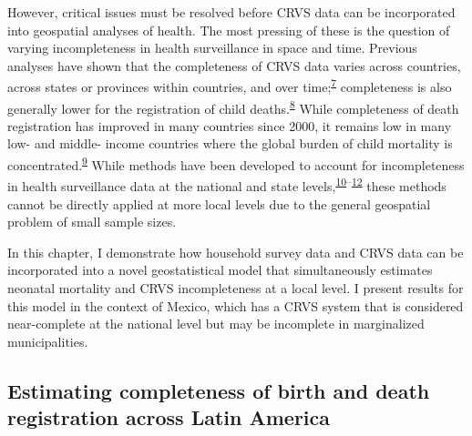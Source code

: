 \documentclass[
]{article}
\begin{document}
However, critical issues must be resolved before CRVS data can be incorporated into geospatial analyses of health. The most pressing of these is the question of varying incompleteness in health surveillance in space and time. Previous analyses have shown that the completeness of CRVS data varies across countries, across states or provinces within countries, and over time;\textsuperscript{\protect\hyperlink{ref-Adair2018}{7}} completeness is also generally lower for the registration of child deaths.\textsuperscript{\protect\hyperlink{ref-Malqvist2008}{8}} While completeness of death registration has improved in many countries since 2000, it remains low in many low- and middle- income countries where the global burden of child mortality is concentrated.\textsuperscript{\protect\hyperlink{ref-Mikkelsen2015}{9}} While methods have been developed to account for incompleteness in health surveillance data at the national and state levels,\textsuperscript{\protect\hyperlink{ref-Murray2010}{10}--\protect\hyperlink{ref-Bhat2002}{12}} these methods cannot be directly applied at more local levels due to the general geospatial problem of small sample sizes.

In this chapter, I demonstrate how household survey data and CRVS data can be incorporated into a novel geostatistical model that simultaneously estimates neonatal mortality and CRVS incompleteness at a local level. I present results for this model in the context of Mexico, which has a CRVS system that is considered near-complete at the national level but may be incomplete in marginalized municipalities.

\hypertarget{estimating-completeness-of-birth-and-death-registration-across-latin-america}{%
\subsection{Estimating completeness of birth and death registration across Latin America}\label{estimating-completeness-of-birth-and-death-registration-across-latin-america}}
\end{document}
